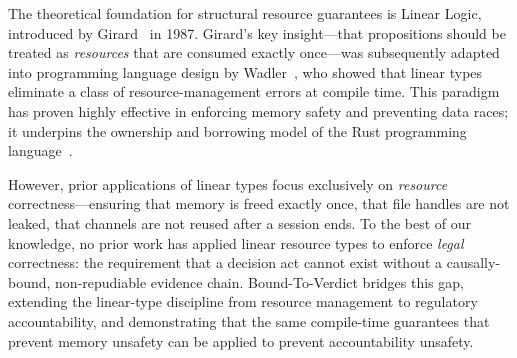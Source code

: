 The theoretical foundation for structural resource guarantees is
Linear Logic, introduced by Girard~\cite{girard1987linear} in 1987.
Girard's key insight---that propositions should be treated as
\emph{resources} that are consumed exactly once---was subsequently
adapted into programming language design by
Wadler~\cite{wadler1991linear}, who showed that linear types
eliminate a class of resource-management errors at compile time.
This paradigm has proven highly effective in enforcing memory safety
and preventing data races; it underpins the ownership and borrowing
model of the Rust programming language~\cite{jung2017rustbelt}.

However, prior applications of linear types focus exclusively on
\emph{resource} correctness---ensuring that memory is freed exactly
once, that file handles are not leaked, that channels are not
reused after a session ends.
To the best of our knowledge, no prior work has applied linear
resource types to enforce \emph{legal} correctness: the requirement
that a decision act cannot exist without a causally-bound,
non-repudiable evidence chain.
Bound-To-Verdict bridges this gap, extending the linear-type
discipline from resource management to regulatory accountability,
and demonstrating that the same compile-time guarantees that prevent
memory unsafety can be applied to prevent accountability unsafety.
